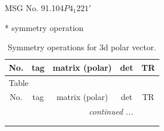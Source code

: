 \documentclass[fleqn,8pt]{jsarticle}
\begin{document}
\setcounter{MaxMatrixCols}{32}

\renewcommand{\tablename}{Table~}
\renewcommand{\figurename}{Figure~}
\begin{center}
\LARGE
MSG No. 91.104\quad$P4_{1}221'$
\end{center}
* symmetry operation
\renewcommand{\arraystretch}{1.3}
\begin{longtable}{ccccc}
\caption{Symmetry operations for 3d polar vector.}
 \\
 \hline \hline
No. & tag & matrix (polar) & det & TR \\ \hline \endfirsthead

\multicolumn{4}{l}{\tablename\ \thetable{}} \\
 \hline \hline
No. & tag & matrix (polar) & det & TR \\ \hline \endhead

 \hline \hline
\multicolumn{4}{r}{\footnotesize\it continued ...} \\ \endfoot

 \hline \hline
\multicolumn{4}{r}{} \\ \endlastfoot


\end{longtable}
\end{document}
